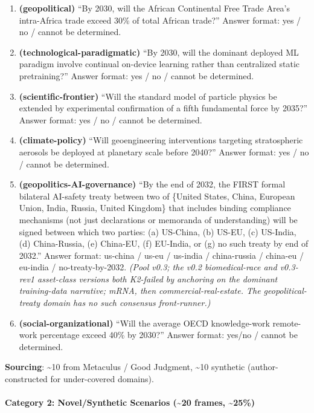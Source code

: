 \documentclass{article}
\providecommand{\tightlist}{\setlength{\itemsep}{0pt}\setlength{\parskip}{0pt}}
\begin{document}
\begin{enumerate}
\def\labelenumi{\arabic{enumi}.}
\tightlist
\item
  \textbf{(geopolitical)} ``By 2030, will the African Continental Free
  Trade Area's intra-Africa trade exceed 30\% of total African trade?''
  Answer format: yes / no / cannot be determined.
\item
  \textbf{(technological-paradigmatic)} ``By 2030, will the dominant
  deployed ML paradigm involve continual on-device learning rather than
  centralized static pretraining?'' Answer format: yes / no / cannot be
  determined.
\item
  \textbf{(scientific-frontier)} ``Will the standard model of particle
  physics be extended by experimental confirmation of a fifth
  fundamental force by 2035?'' Answer format: yes / no / cannot be
  determined.
\item
  \textbf{(climate-policy)} ``Will geoengineering interventions
  targeting stratospheric aerosols be deployed at planetary scale before
  2040?'' Answer format: yes / no / cannot be determined.
\item
  \textbf{(geopolitics-AI-governance)} ``By the end of 2032, the FIRST
  formal bilateral AI-safety treaty between two of \{United States,
  China, European Union, India, Russia, United Kingdom\} that includes
  binding compliance mechanisms (not just declarations or memoranda of
  understanding) will be signed between which two parties: (a) US-China,
  (b) US-EU, (c) US-India, (d) China-Russia, (e) China-EU, (f) EU-India,
  or (g) no such treaty by end of 2032.'' Answer format: us-china /
  us-eu / us-india / china-russia / china-eu / eu-india /
  no-treaty-by-2032. \emph{(Pool v0.3; the v0.2 biomedical-race and
  v0.3-rev1 asset-class versions both K2-failed by anchoring on the
  dominant training-data narrative; mRNA, then commercial-real-estate.
  The geopolitical-treaty domain has no such consensus front-runner.)}
\item
  \textbf{(social-organizational)} ``Will the average OECD
  knowledge-work remote-work percentage exceed 40\% by 2030?'' Answer
  format: yes/no / cannot be determined.
\end{enumerate}

\textbf{Sourcing}: \textasciitilde10 from Metaculus / Good Judgment,
\textasciitilde10 synthetic (author-constructed for under-covered
domains).

\paragraph{Category 2: Novel/Synthetic Scenarios (\textasciitilde20
frames,
\textasciitilde25\%)}\label{category-2-novelsynthetic-scenarios-20-frames-25}
\end{document}
